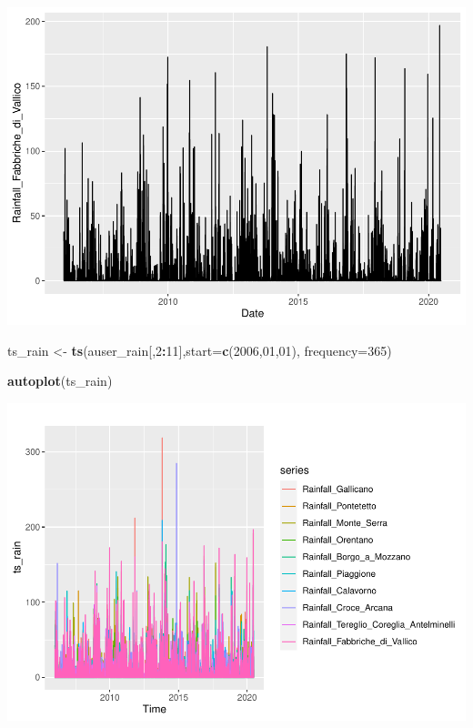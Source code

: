 \documentclass[
]{article}
\newenvironment{Shaded}{\begin{snugshade}}{\end{snugshade}}
\newcommand{\AttributeTok}[1]{\textcolor[rgb]{0.13,0.29,0.53}{#1}}
\newcommand{\DecValTok}[1]{\textcolor[rgb]{0.00,0.00,0.81}{#1}}
\newcommand{\FunctionTok}[1]{\textcolor[rgb]{0.13,0.29,0.53}{\textbf{#1}}}
\newcommand{\NormalTok}[1]{#1}
\newcommand{\OtherTok}[1]{\textcolor[rgb]{0.56,0.35,0.01}{#1}}
\newcommand{\SpecialCharTok}[1]{\textcolor[rgb]{0.81,0.36,0.00}{\textbf{#1}}}
\begin{document}
\includegraphics{Kaufman_McNeill_ENV797_Project_files/figure-latex/unnamed-chunk-4-1.pdf}

\begin{Shaded}
\begin{Highlighting}[]
\NormalTok{ts\_rain }\OtherTok{\textless{}{-}} \FunctionTok{ts}\NormalTok{(auser\_rain[,}\DecValTok{2}\SpecialCharTok{:}\DecValTok{11}\NormalTok{],}\AttributeTok{start=}\FunctionTok{c}\NormalTok{(}\DecValTok{2006}\NormalTok{,}\DecValTok{01}\NormalTok{,}\DecValTok{01}\NormalTok{), }\AttributeTok{frequency=}\DecValTok{365}\NormalTok{)}

\FunctionTok{autoplot}\NormalTok{(ts\_rain)}
\end{Highlighting}
\end{Shaded}

\includegraphics{Kaufman_McNeill_ENV797_Project_files/figure-latex/unnamed-chunk-4-2.pdf}
\end{document}
